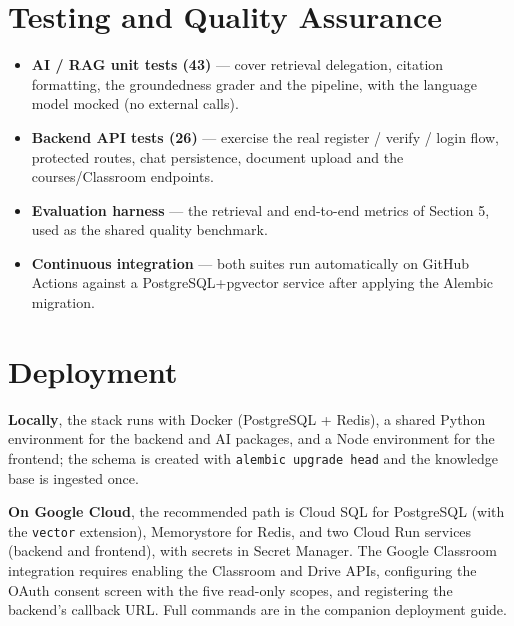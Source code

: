 \documentclass[11pt,a4paper]{article}
\begin{document}
\section{Testing and Quality Assurance}
\begin{itemize}
\item \textbf{AI / RAG unit tests (43)} --- cover retrieval delegation, citation formatting, the groundedness grader and the pipeline, with the language model mocked (no external calls).
\item \textbf{Backend API tests (26)} --- exercise the real register / verify / login flow, protected routes, chat persistence, document upload and the courses/Classroom endpoints.
\item \textbf{Evaluation harness} --- the retrieval and end-to-end metrics of Section 5, used as the shared quality benchmark.
\item \textbf{Continuous integration} --- both suites run automatically on GitHub Actions against a PostgreSQL+pgvector service after applying the Alembic migration.
\end{itemize}

\section{Deployment}
\textbf{Locally}, the stack runs with Docker (PostgreSQL + Redis), a shared Python environment for the backend and AI packages, and a Node environment for the frontend; the schema is created with \texttt{alembic upgrade head} and the knowledge base is ingested once.

\textbf{On Google Cloud}, the recommended path is Cloud SQL for PostgreSQL (with the \texttt{vector} extension), Memorystore for Redis, and two Cloud Run services (backend and frontend), with secrets in Secret Manager. The Google Classroom integration requires enabling the Classroom and Drive APIs, configuring the OAuth consent screen with the five read-only scopes, and registering the backend's callback URL. Full commands are in the companion deployment guide.

\end{document}
